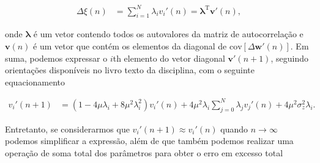 \documentclass[a4paper,10pt]{article}
\begin{document}
\begin{enumerate}
\begin{enumerate}
						\begin{align}
							\Delta \xi(n) &= \sum^{N}_{i = 1} \lambda_{i} v_{i}'(n) = \mathbf{\lambda}^{\text{T}} \mathbf{v}'(n),
						\end{align}

						onde $\mathbf{\lambda}$ é um vetor contendo todos os autovalores da matriz de autocorrelação e $\mathbf{v}(n)$ é um vetor que contém os elementos da diagonal de $\text{cov} \left[\Delta \mathbf{w}'(n)\right]$. Em suma, podemos 
						expressar o $i$th elemento do vetor diagonal $\mathbf{v}'(n + 1)$, seguindo orientações disponíveis no livro texto da disciplina, com o seguinte equacionamento

						\begin{align}
							v_{i}'(n + 1) &= (1 - 4 \mu \lambda_{i} + 8 \mu^{2} \lambda^{2}_{i}) v_{i}'(n) + 4 \mu^{2} \lambda_{i} \sum^{N}_{j = 0} \lambda_{j} v_{j}'(n) + 4 \mu^{2} \sigma^{2}_{z} \lambda_{i}.
						\end{align}

						Entretanto, se considerarmos que $v_{i}'(n + 1) \approx v_{i}'(n)$ quando $n \rightarrow \infty$ podemos simplificar a expressão, além de que 
						também podemos realizar uma operação de soma total dos parâmetros para obter o erro em excesso total


\end{enumerate}
\end{enumerate}
\end{document}
